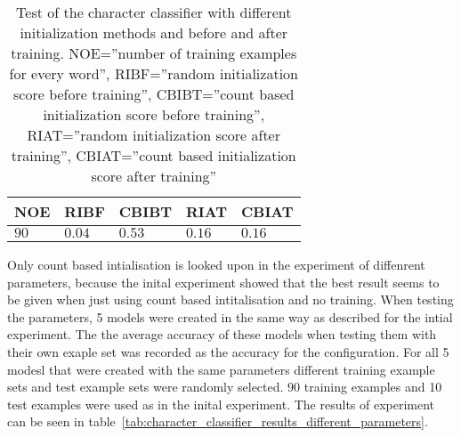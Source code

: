 \begin{table}[htb]
  \begin{center}
  \begin{tabular}{ l l l l l }
    NOE    & RIBF   & CBIBT  & RIAT    & CBIAT \\ \hline
    $90$  & $0.04$ & $0.53$ & $0.16$  & $0.16$  \\   
  \end{tabular}
\end{center}
\caption{Test of the character classifier with different initialization methods and before and after training.
	 NOE=''number of training examples for every word'',
         RIBF=''random initialization score before training'',
         CBIBT=''count based initialization score before training'',
         RIAT=''random initialization score after training'',
         CBIAT=''count based initialization score after training''} 
\label{tab:character_classifier_initial_experiment} 
\end{table}

Only count based intialisation is looked upon in the experiment of diffenrent parameters, because the inital experiment showed that the best result seems to be given when just using count based intitalisation and no training. When testing the parameters, 5 models were created in the same way as described for the intial experiment. The the average accuracy of these models when testing them with their own exaple set was recorded as the accuracy for the configuration. For all 5 modesl that were created with the same parameters different training example sets and test example sets were randomly selected. 90 training examples and 10 test examples were used as in the inital experiment. The results of experiment can be seen in table~\ref{tab:character_classifier_results_different_parameters}.

